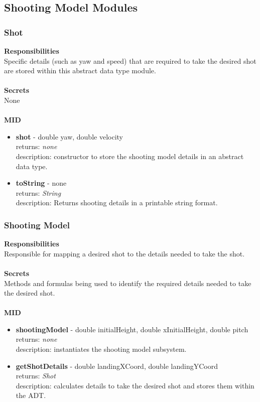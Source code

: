 \documentclass[11pt]{article}
\begin{document}
\subsection{Shooting Model Modules}
\subsubsection*{Shot}
\textbf{Responsibilities} \\
Specific details (such as yaw and speed) that are required to take the desired shot are stored within this abstract data type module. \\ \\
\textbf{Secrets} \\ 
None \\  \\
\textbf{MID} 
\begin{itemize}
\item \textbf{shot} - double yaw, double velocity \\ returns: \textit{none} \\ description: constructor to store the shooting model details in an abstract data type.
\item \textbf{toString} - none \\ returns: \textit{String} \\ description: Returns shooting details in a printable string format.
\end{itemize}

\subsubsection*{Shooting Model}
\textbf{Responsibilities} \\
Responsible for mapping a desired shot to the details needed to take the shot. \\ \\
\textbf{Secrets} \\ 
Methods and formulas being used to identify the required details needed to take the desired shot. \\  \\
\textbf{MID} 
\begin{itemize}
\item \textbf{shootingModel} - double  initialHeight, double xInitialHeight, double pitch \\ returns: \textit{none} \\ description: instantiates the shooting model subsystem.
\item \textbf{getShotDetails} - double landingXCoord, double landingYCoord \\ returns: \textit{Shot} \\ description: calculates details to take the desired shot and stores them within the ADT.
\end{itemize}
\end{document}
